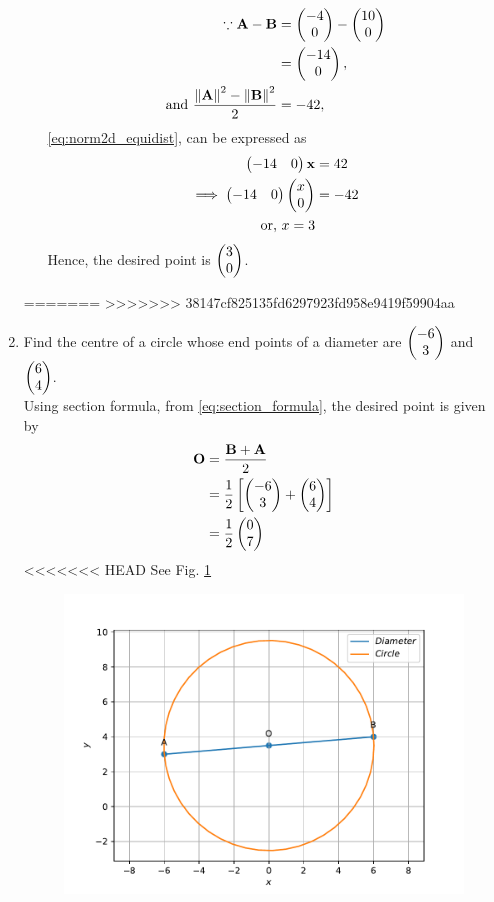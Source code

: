 \documentclass[journal,12pt,twocolumn]{IEEEtran}
\renewcommand\thesection{\arabic{section}}
\begin{document}
\begin{enumerate}[label=\thesection.\arabic*.,ref=\thesection.\theenumi]
\begin{enumerate}
		\begin{align}
	\because  \mathbf{A}-\mathbf{B} &= \begin{pmatrix} -4 \\ 0\end{pmatrix}-\begin{pmatrix}10 \\ 0\end{pmatrix}
	  \\
	  &= \begin{pmatrix} -14 \\ 0\end{pmatrix},
	  \\
			\text{and }	   \frac{\left\lVert\mathbf{A}\right\rVert^2 - \left\lVert\mathbf{B}\right\rVert^2}{2} &= -42,
  \end{align}
  \eqref{eq:norm2d_equidist}, can be expressed as 
  \begin{align}
	  \begin{pmatrix} -14 & 0\end{pmatrix}\mathbf{x} 
	  &=  42
	  \\
	  \implies 
	  \begin{pmatrix} -14 & 0\end{pmatrix}\begin{pmatrix}x \\ 0\end{pmatrix} 
	  &=  -42
	  \\
	  \text{or, } x =3 
  \end{align}
  Hence, the desired point is $\begin{pmatrix} 3 \\ 0\end{pmatrix}$.
  \end{enumerate}
=======
>>>>>>> 38147cf825135fd6297923fd958e9419f59904aa
  \item Find the centre of a circle whose end points of a diameter are $\begin{pmatrix} -6 \\ 3\end{pmatrix}$ and $\begin{pmatrix}6 \\ 4\end{pmatrix}$.
	  \\
		\solution 
Using section formula, 
	  from \eqref{eq:section_formula},
		the desired point is given by 
  \begin{align}
	  \mathbf{O}&= \frac{\mathbf{B}+ \mathbf{A}}{2}
	  \\
	  &= \frac{1}{2}{}\left[\begin{pmatrix} -6 \\ 3\end{pmatrix}+\begin{pmatrix}6 \\ 4\end{pmatrix}\right]
	  \\
	  &=\frac{1}{2}\begin{pmatrix}0 \\ 7\end{pmatrix}
  \end{align}
<<<<<<< HEAD
    See Fig. 
	  \ref{fig:cbse-10-3.pdf}
  \begin{figure}
	  \centering 
	  \includegraphics[width=\columnwidth]{figs/cbse-10-3.pdf}
	  \caption{}
	  \label{fig:cbse-10-3.pdf}
	  \end{figure}


\end{enumerate}
\end{document}

